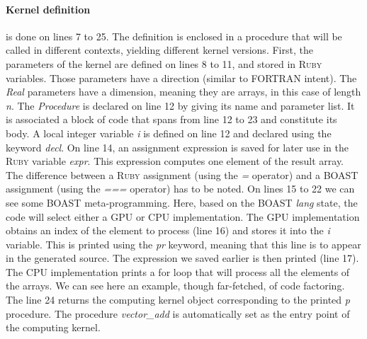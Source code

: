 \documentclass[11pt, a4paper, twoside]{montblanc2}
\def\ruby{\textsc{Ruby}\xspace}
\begin{document}
\paragraph{Kernel definition} is done on lines 7 to 25.
The definition is enclosed in a procedure that will be called in different contexts, yielding different kernel versions.
First, the parameters of the kernel are defined on lines 8 to 11, and stored in \ruby variables.
Those parameters have a direction (similar to FORTRAN intent). The \emph{Real} parameters have a dimension, meaning they are arrays, in this case of length \emph{n}.
The \emph{Procedure} is declared on line 12 by giving its name and parameter list.
It is associated a block of code that spans from line 12 to 23 and constitute its body.
A local integer variable \emph{i} is defined on line 12 and declared using the keyword \emph{decl}.
On line 14, an assignment expression is saved for later use in the \ruby variable \emph{expr}.
This expression computes one element of the result array.
The difference between a \ruby assignment (using the \emph{=} operator) and a BOAST assignment (using the \emph{===} operator) has to be noted.
On lines 15 to 22 we can see some BOAST meta-programming.
Here, based on the BOAST \emph{lang} state, the code will select either a GPU or CPU implementation.
The GPU implementation obtains an index of the element to process (line 16) and stores it into the \emph{i} variable.
This is printed using the \emph{pr} keyword, meaning that this line is to appear in the generated source.
The expression we saved earlier is then printed (line 17).
The CPU implementation prints a for loop that will process all the elements of the arrays.
We can see here an example, though far-fetched, of code factoring.
The line 24 returns the computing kernel object corresponding to the printed \emph{p} procedure.
The procedure \emph{vector\_add} is automatically set as the entry point of the computing kernel.
\end{document}
